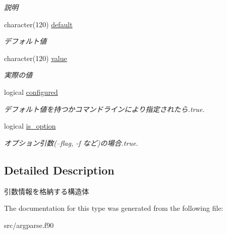 \begin{DoxyCompactItemize}
\begin{DoxyCompactList}\small\item\em 説明 \end{DoxyCompactList}\item 
\hypertarget{structargparse_1_1argument_ae3efa481b93682866f4a919ee8fa7acc}{character(120) \hyperlink{structargparse_1_1argument_ae3efa481b93682866f4a919ee8fa7acc}{default}}\label{structargparse_1_1argument_ae3efa481b93682866f4a919ee8fa7acc}

\begin{DoxyCompactList}\small\item\em デフォルト値 \end{DoxyCompactList}\item 
\hypertarget{structargparse_1_1argument_ac27c0d0f82a43d1ce892490cf29820fe}{character(120) \hyperlink{structargparse_1_1argument_ac27c0d0f82a43d1ce892490cf29820fe}{value}}\label{structargparse_1_1argument_ac27c0d0f82a43d1ce892490cf29820fe}

\begin{DoxyCompactList}\small\item\em 実際の値 \end{DoxyCompactList}\item 
\hypertarget{structargparse_1_1argument_abd899a042019ea96a2a0bd99944bae45}{logical \hyperlink{structargparse_1_1argument_abd899a042019ea96a2a0bd99944bae45}{configured}}\label{structargparse_1_1argument_abd899a042019ea96a2a0bd99944bae45}

\begin{DoxyCompactList}\small\item\em デフォルト値を持つかコマンドラインにより指定されたら.\-true. \end{DoxyCompactList}\item 
\hypertarget{structargparse_1_1argument_a15694087f9f24f5fab214e23b1ae07d7}{logical \hyperlink{structargparse_1_1argument_a15694087f9f24f5fab214e23b1ae07d7}{is\-\_\-option}}\label{structargparse_1_1argument_a15694087f9f24f5fab214e23b1ae07d7}

\begin{DoxyCompactList}\small\item\em オプション引数(--flag, -\/f など)の場合.\-true. \end{DoxyCompactList}\end{DoxyCompactItemize}


\subsection{Detailed Description}
引数情報を格納する構造体 

The documentation for this type was generated from the following file\-:\begin{DoxyCompactItemize}
\item 
src/argparse.\-f90\end{DoxyCompactItemize}
